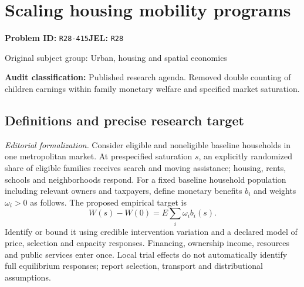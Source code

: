 \documentclass[11pt,a4paper]{article}
\begin{document}
\section*{Scaling housing mobility programs}
\textbf{Problem ID:} \texttt{R28-415}\quad \textbf{JEL:} \texttt{R28}\par
\label{problem:OP-0464}
{\sffamily\small\color{muted}Original subject group: Urban, housing and spatial economics\par}
\label{definitions:problem:30007746}
\textbf{Audit classification:} Published research agenda. Removed double counting of children earnings within family monetary welfare and specified market saturation.
\subsection*{Definitions and precise research target}
\textit{Editorial formalization.} Consider eligible and noneligible baseline households in one metropolitan market. At prespecified saturation \(s\), an explicitly randomized share of eligible families receives search and moving assistance; housing, rents, schools and neighborhoods respond. For a fixed baseline household population including relevant owners and taxpayers, define monetary benefits \(b_i\) and weights \(\omega_i>0\) as follows. The proposed empirical target is \[W(s)-W(0)=E\sum_i\omega_i b_i(s).\] Identify or bound it using credible intervention variation and a declared model of price, selection and capacity responses. Financing, ownership income, resources and public services enter once. Local trial effects do not automatically identify full equilibrium responses; report selection, transport and distributional assumptions.
\end{document}
